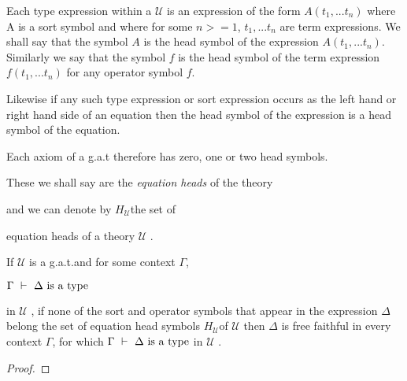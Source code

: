 \documentclass[10pt,a4paper,fleqn]{article}
\newcommand{\gat}[1][U]{
\ensuremath{\mathcal{#1}} }
\newcommand{\isagat}[1][U]{\gat[#1] is a g.a.t.}
\newcommand{\heads}[1][U]{\ensuremath{H_{\gat[#1]}}}
\begin{document}
\begin{definition}
Each type expression within a \gat is an expression of the form $A(t_1,...t_n)$
where A is a sort symbol and where for some $n >= 1$, $t_1,...t_n$ are term expressions.
We shall say that the symbol $A$ is the head symbol of the expression $A(t_1,...t_n)$.
Similarly we say that the symbol $f$ is the head symbol of the term expression
$f(t_1,...t_n)$ for any operator symbol $f$. 

Likewise if any such type expression or sort expression occurs as the left hand or right hand side of an equation then the head symbol of the expression is a head symbol of the equation. 

Each axiom of a g.a.t therefore has zero, one or two head symbols. 

These we shall say are the \textit{equation heads} of the theory 

and we can denote by \heads the set of 

equation heads of a theory \gat.
\end{definition}

\begin{lemma}
If \isagat and for some context $\Gamma$, \\
\begin{center}
$\Gamma\  \tstyle\ \isT{\Delta}$ 
\end{center}
\noindent
in \gat, if none of the sort and operator symbols that appear in the expression $\Delta$ belong the set of equation head symbols \heads of \gat then $\Delta$ is 
free faithful in every context $\Gamma$, for which  $\Gamma\  \tstyle\ \isT{\Delta}$ in \gat.
\end{lemma}
 
\begin{proof}

\end{proof}
 



 
\end{document}
